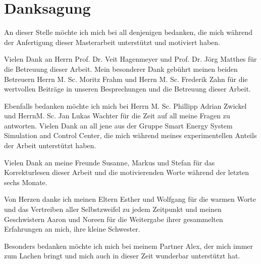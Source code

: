 \chapter*{Danksagung}
\thispagestyle{empty}
An dieser Stelle möchte ich mich bei all denjenigen bedanken, die mich während der Anfertigung dieser Masterarbeit unterstützt und motiviert haben.\newline

\noindent
Vielen Dank an Herrn Prof. Dr. Veit Hagenmeyer und Prof. Dr. Jörg Matthes für die Betreuung dieser Arbeit.\newline
Mein besonderer Dank gebührt meinen beiden Betreuern Herrn M. Sc. Moritz Frahm und Herrn M. Sc. Frederik Zahn für die wertvollen Beiträge in unseren Besprechungen und die Betreuung dieser Arbeit.\newline

\noindent
Ebenfalls bedanken möchte ich mich bei Herrn M. Sc. Phillipp Adrian Zwickel und Herrn\newline M. Sc. Jan Lukas Wachter für die Zeit auf all meine Fragen zu antworten. Vielen Dank an all jene aus der Gruppe Smart Energy System Simulation and Control Center, die mich während meines experimentellen Anteils der Arbeit unterstützt haben.\newline

\noindent
Vielen Dank an meine Freunde Susanne, Markus und Stefan für das Korrekturlesen dieser Arbeit und die motivierenden Worte während der letzten sechs Monate.\newline

\noindent
Von Herzen danke ich meinen Eltern Esther und Wolfgang für die warmen Worte und das Vertreiben aller Selbstzweifel zu jedem Zeitpunkt und meinen Geschwistern Aaron und Noreen für die Weitergabe ihrer gesammelten Erfahrungen an mich, ihre kleine Schwester.\newline

\noindent
Besonders bedanken möchte ich mich bei meinem Partner Alex, der mich immer zum Lachen bringt und mich auch in dieser Zeit wunderbar unterstützt hat.\newline
